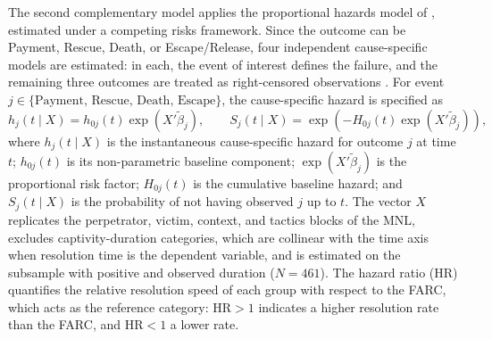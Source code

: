 \documentclass[ecta,nameyear,draft]{econsocart}
\theoremstyle{plain}
\theoremstyle{definition}
\newcommand{\1}{\mathbf{1}}
\begin{document}
The second complementary model applies the proportional hazards model of \citet{Cox1972}, estimated under a competing risks framework. Since the outcome can be Payment, Rescue, Death, or Escape/Release, four independent cause-specific models are estimated: in each, the event of interest defines the failure, and the remaining three outcomes are treated as right-censored observations \citet{Bradburn2003}. For event $j\in\{\text{Payment, Rescue, Death, Escape}\}$, the cause-specific hazard is specified as
\begin{equation}
h_j(t \mid X) = h_{0j}(t)\exp\!\left(X'\tilde{\beta}_j\right),
\qquad
S_j(t \mid X) = \exp\!\left(-H_{0j}(t)\exp\!\left(X'\tilde{\beta}_j\right)\right),
\label{eq:cox}
\end{equation}
where $h_j(t\mid X)$ is the instantaneous cause-specific hazard for outcome $j$ at time $t$; $h_{0j}(t)$ is its non-parametric baseline component; $\exp(X'\tilde{\beta}_j)$ is the proportional risk factor; $H_{0j}(t)$ is the cumulative baseline hazard; and $S_j(t\mid X)$ is the probability of not having observed $j$ up to $t$. The vector $X$ replicates the perpetrator, victim, context, and tactics blocks of the MNL, excludes captivity-duration categories, which are collinear with the time axis when resolution time is the dependent variable, and is estimated on the subsample with positive and observed duration ($N=461$). The hazard ratio (HR) quantifies the relative resolution speed of each group with respect to the FARC, which acts as the reference category: HR$>1$ indicates a higher resolution rate than the FARC, and HR$<1$ a lower rate.
\end{document}
